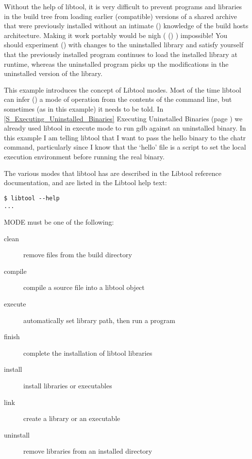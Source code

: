 Without the help of libtool, it is very difficult to prevent programs and 
libraries in the build tree from loading earlier (compatible) versions of a 
shared archive that were previously installed without an intimate ({\McQ{}}) 
knowledge of the build hosts architecture. Making it work portably would be 
nigh ( ({\MbQ{}}) {\McQ{}}) impossible! You should experiment ({\MaQ{}}) with changes to 
the uninstalled library and satisfy yourself that the previously installed 
program continues to load the installed library at runtime, whereas the 
uninstalled program picks up the modifications in the uninstalled version 
of the library. 

This example introduces the concept of Libtool modes. Most of the time libtool 
can infer ({\MmQ{}}) a mode of operation from the contents of the command line,
but sometimes (as in this example) it needs to be told.
In \ref{S_Executing_Uninstalled_Binaries} Executing Uninstalled Binaries (page
\pageref{S_Executing_Uninstalled_Binaries}) we already used libtool in execute 
mode to run gdb against an uninstalled binary. In this example I am telling 
libtool that I want to pass the hello binary to the chatr command, particularly since I know that the `hello' file is a script to set the local execution environment before running the real binary. 


The various modes that libtool has are described in the Libtool reference documentation, and are listed in the Libtool help text: 

\begin{verbatim}
$ libtool --help
...
\end{verbatim}

MODE must be one of the following:

\begin{description}
\item[clean]           remove files from the build directory
\item[compile]         compile a source file into a libtool object
\item[execute]         automatically set library path, then run a program
\item[finish]          complete the installation of libtool libraries
\item[install]         install libraries or executables
\item[link]            create a library or an executable
\item[uninstall]       remove libraries from an installed directory
\end{description}

